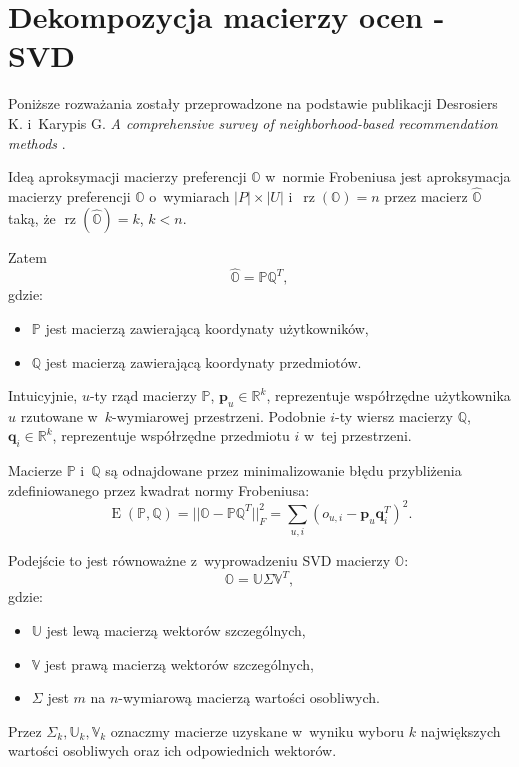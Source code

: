 \documentclass[12pt,a4paper]{report}
\newcommand{\setR}{\mathbb{R}}
\newcommand{\rz}[1]{\operatorname{rz}\left({#1} \right)}
\newcommand{\e}[1]{\operatorname{E}\left({#1} \right)}
\begin{document}
\section{Dekompozycja macierzy ocen - SVD}
Poniższe rozważania zostały przeprowadzone na podstawie publikacji Desrosiers K. i~Karypis G. \textit{A comprehensive survey of neighborhood-based recommendation methods} {\citep[Sec 4.1.1]{acsonbrs}}.

Ideą aproksymacji macierzy preferencji $\mathbb{O}$ w~normie Frobeniusa jest aproksymacja macierzy preferencji $\mathbb{O}$ o~wymiarach $|\mathit{P}| \times |\mathit{U}|$ i~$\rz{\mathbb{O}} = n$ przez macierz $\widehat{\mathbb{O}}$ taką, że $\rz{\widehat{\mathbb{O}}} = k$, $k<n$. 

Zatem
$$
\widehat{\mathbb{O}} = \mathbb{P}\mathbb{Q}^T,
$$
gdzie:
\begin{itemize}
\item $\mathbb{P}$ jest macierzą zawierającą koordynaty użytkowników,
\item $\mathbb{Q}$ jest macierzą zawierającą koordynaty przedmiotów.
\end{itemize}

Intuicyjnie, $u$-ty rząd macierzy $\mathbb{P}$, $\mathbf{p}_u \in \setR^k$, reprezentuje współrzędne użytkownika $u$ rzutowane w~$k$-wymiarowej przestrzeni. Podobnie $i$-ty wiersz macierzy $\mathbb{Q}$, $\mathbf{q}_i \in \setR^k$, reprezentuje współrzędne przedmiotu $i$ w~tej przestrzeni.

Macierze $\mathbb{P}$ i~$\mathbb{Q}$ są odnajdowane przez minimalizowanie błędu przybliżenia zdefiniowanego przez kwadrat normy Frobeniusa:
$$
\e{\mathbb{P}, \mathbb{Q}} = ||\mathbb{O}-\mathbb{P} \mathbb{Q}^T||_F^2 = \sum_{u,i}(o_{u,i} - \mathbf{p}_u\mathbf{q}_i^T)^2.
$$

Podejście to jest równoważne z~wyprowadzeniu SVD macierzy $\mathbb{O}$:
$$
\mathbb{O} = \mathbb{U} \Sigma \mathbb{V}^T,
$$
gdzie:
\begin{itemize}
\item $\mathbb{U}$ jest lewą macierzą wektorów szczególnych,
\item $\mathbb{V}$ jest prawą macierzą wektorów szczególnych,
\item $\Sigma$ jest $m$ na $n$-wymiarową macierzą wartości osobliwych.
\end{itemize}

Przez $\Sigma_k, \mathbb{U}_k, \mathbb{V}_k$ oznaczmy macierze uzyskane w~wyniku wyboru $k$ największych wartości osobliwych oraz ich odpowiednich wektorów. 
\end{document}
